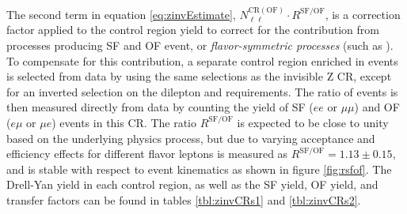 The second term in equation \ref{eq:zinvEstimate}, $N_{\ell\ell}^{\mathrm{CR(OF)}}\cdot R^{\mathrm{SF/OF}}$, is a correction factor applied to the control region yield to correct for the contribution from processes producing SF and OF event, or {\it flavor-symmetric processes} (such as \ttbar). To compensate for this contribution, a separate control region enriched in \ttbar events is selected from data by using the same selections as the invisible Z CR, except for an inverted selection on the dilepton \pt and \mll requirements. The ratio of \ttbar events is then measured directly from data by counting the yield of SF ($ee$ or $\mu\mu$) and OF ($e\mu$ or $\mu e$) events in this CR. The ratio $R^{\mathrm{SF/OF}}$ is expected to be close to unity based on the underlying physics process, but due to varying acceptance and efficiency effects for different flavor leptons is measured as $R^{\mathrm{SF/OF}} = 1.13 \pm 0.15$, and is stable with respect to event kinematics as shown in figure \ref{fig:rsfof}. The Drell-Yan yield in each control region, as well as the SF yield, OF yield, and transfer factors can be found in tables \ref{tbl:zinvCRs1} and \ref{tbl:zinvCRs2}.
